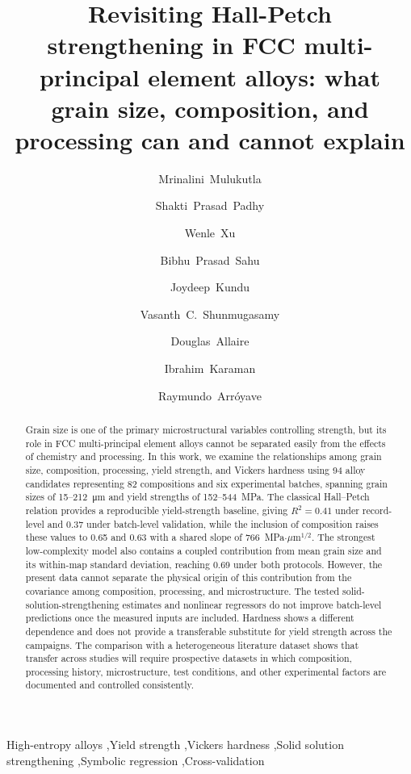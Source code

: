 \documentclass[5p,times,twocolumn]{elsarticle}
\begin{document}
\begin{frontmatter}

\title{Revisiting Hall-Petch strengthening in FCC multi-principal element alloys: what grain size, composition, and processing can and cannot explain}

\author[mse]{Mrinalini~Mulukutla}
\author[mse,mae]{Shakti~Prasad~Padhy}
\author[mse]{Wenle~Xu}
\author[mse]{Bibhu~Prasad~Sahu}
\author[mse]{Joydeep~Kundu}
\author[mse]{Vasanth~C.~Shunmugasamy}
\author[mae]{Douglas~Allaire}
\author[mse]{Ibrahim~Karaman}
\author[mse,mae]{Raymundo~Arr\'{o}yave}

\begin{abstract}
Grain size is one of the primary microstructural variables controlling strength, but its role in FCC multi-principal element alloys cannot be separated easily from the effects of chemistry and processing. In this work, we examine the relationships among grain size, composition, processing, yield strength, and Vickers hardness using 94 alloy candidates representing 82 compositions and six experimental batches, spanning grain sizes of 15--212~\si{\micro\meter} and yield strengths of 152--544~MPa. The classical Hall--Petch relation provides a reproducible yield-strength baseline, giving $R^2=0.41$ under record-level and 0.37 under batch-level validation, while the inclusion of composition raises these values to 0.65 and 0.63 with a shared slope of 766~MPa$\cdot\mu$m$^{1/2}$. The strongest low-complexity model also contains a coupled contribution from mean grain size and its within-map standard deviation, reaching 0.69 under both protocols. However, the present data cannot separate the physical origin of this contribution from the covariance among composition, processing, and microstructure. The tested solid-solution-strengthening estimates and nonlinear regressors do not improve batch-level predictions once the measured inputs are included. Hardness shows a different dependence and does not provide a transferable substitute for yield strength across the campaigns. The comparison with a heterogeneous literature dataset shows that transfer across studies will require prospective datasets in which composition, processing history, microstructure, test conditions, and other experimental factors are documented and controlled consistently.
\end{abstract}

\begin{keyword}
High-entropy alloys \sep Yield strength \sep Vickers hardness \sep Solid solution strengthening \sep Symbolic regression \sep Cross-validation
\end{keyword}
\end{frontmatter}
\end{document}
